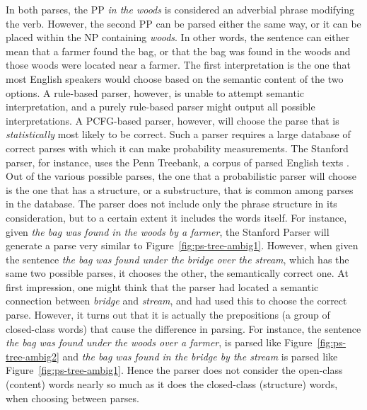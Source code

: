 \documentclass[main.tex]{subfiles}
\begin{document}
In both parses, the PP \textit{in the woods} is considered an adverbial phrase modifying the verb. However, the second PP can be parsed either the same way, or it can be placed within the NP containing \textit{woods}. In other words, the sentence can either mean that a farmer found the bag, or that the bag was found in the woods and those woods were located near a farmer. The first interpretation is the one that most English speakers would choose based on the semantic content of the two options. A rule-based parser, however, is unable to attempt semantic interpretation, and a purely rule-based parser might output all possible interpretations. A PCFG-based parser, however, will choose the parse that is \textit{statistically} most likely to be correct. Such a parser requires a large database of correct parses with which it can make probability measurements. The Stanford parser, for instance, uses the Penn Treebank, a corpus of parsed English texts \citep{marcus:1993}. Out of the various possible parses, the one that a probabilistic parser will choose is the one that has a structure, or a substructure, that is common among parses in the database. The parser does not include only the phrase structure in its consideration, but to a certain extent it includes the words itself. For instance, given \textit{the bag was found in the woods by a farmer}, the Stanford Parser will generate a parse very similar to Figure~\ref{fig:ps-tree-ambig1}. However, when given the sentence \textit{the bag was found under the bridge over the stream}, which has the same two possible parses, it chooses the other, the semantically correct one. At first impression, one might think that the parser had located a semantic connection between \textit{bridge} and \textit{stream}, and had used this to choose the correct parse. However, it turns out that it is actually the prepositions (a group of closed-class words) that cause the difference in parsing. For instance, the sentence \textit{the bag was found under the woods over a farmer}, is parsed like Figure~\ref{fig:ps-tree-ambig2} and \textit{the bag was found in the bridge by the stream} is parsed like Figure~\ref{fig:ps-tree-ambig1}. Hence the parser does not consider the open-class (content) words nearly so much as it does the closed-class (structure) words, when choosing between parses.
\end{document}
